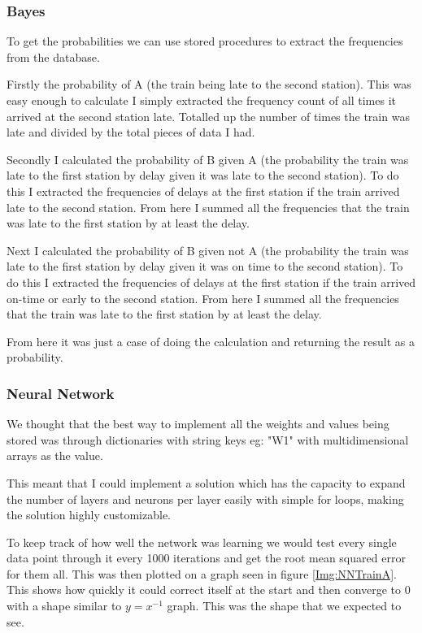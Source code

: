 \documentclass[11pt]{article}
\begin{document}
	\subsubsection{Bayes}
	To get the probabilities we can use stored procedures to extract the frequencies from the database.
	
	Firstly the probability of A (the train being late to the second station). This was easy enough to calculate I simply extracted the frequency count of all times it arrived at the second station late. Totalled up the number of times the train was late and divided by the total pieces of data I had.
	
	Secondly I calculated the probability of B given A (the probability the train was late to the first station by delay given it was late to the second station). To do this I extracted the frequencies of delays at the first station if the train arrived late to the second station. From here I summed all the frequencies that the train was late to the first station by at least the delay.
	
	Next I calculated the probability of B given not A (the probability the train was late to the first station by delay given it was on time to the second station). To do this I extracted the frequencies of delays at the first station if the train arrived on-time or early to the second station. From here I summed all the frequencies that the train was late to the first station by at least the delay.	
	
	From here it was just a case of doing the calculation and returning the result as a probability.
	
	\subsubsection{Neural Network}
	
	 We thought that the best way to implement all the weights and values being stored was through dictionaries with string keys eg: "W1" with multidimensional arrays as the value. 
	 
	 This meant that I could implement a solution which has the capacity to expand the number of layers and neurons per layer easily with simple for loops, making the solution highly customizable.
	 
	 To keep track of how well the network was learning we would test every single data point through it every 1000 iterations and get the root mean squared error for them all. This was then plotted on a graph seen in figure \ref{Img:NNTrainA}. This shows how quickly it could correct itself at the start and then converge to 0 with a shape similar to $y=x^{-1}$ graph. This was the shape that we expected to see.
	 
\end{document}
